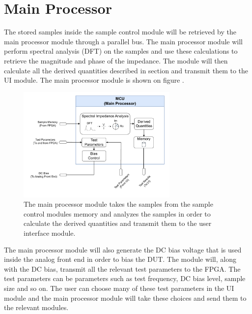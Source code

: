 \section{Main Processor} \label{sec:MainProcessor}
The stored samples inside the sample control module will be retrieved by the main processor module through a parallel bus. The main processor module will perform spectral analysis (DFT) on the samples and use these calculations to retrieve the magnitude and phase of the impedance. The module will then calculate all the derived quantities described in section  and transmit them to the UI module. The main processor module is shown on figure .

\begin{figure}[H]
    \centering
    \includegraphics[clip, trim=18 0 18 0,width=0.70\textwidth]{Sections/6_SystemArchitecture/Figures/MCU.pdf}
    \caption{The main processor module takes the samples from the sample control modules memory and analyzes the samples in order to calculate the derived quantities and transmit them to the user interface module.}
    \label{fig_6_4_MainprocessorModule}
\end{figure}

The main processor module will also generate the DC bias voltage that is used inside the analog front end in order to bias the DUT. The module will, along with the DC bias, transmit all the relevant test parameters to the FPGA. The test parameters can be parameters such as test frequency, DC bias level, sample size and so on. The user can choose many of these test parameters in the UI module and the main processor module will take these choices and send them to the relevant modules.

